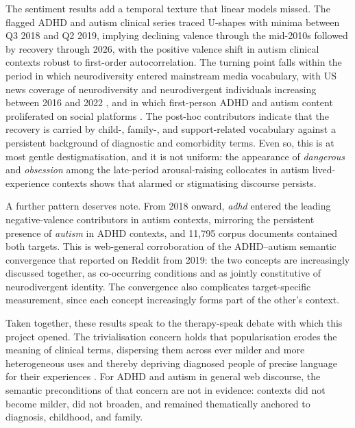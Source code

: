 The sentiment results add a temporal texture that linear models missed. The flagged ADHD and autism clinical series traced U-shapes with minima between Q3 2018 and Q2 2019, implying declining valence through the mid-2010s followed by recovery through 2026, with the positive valence shift in autism clinical contexts robust to first-order autocorrelation. The turning point falls within the period in which neurodiversity entered mainstream media vocabulary, with US news coverage of neurodiversity and neurodivergent individuals increasing between 2016 and 2022 \citep{huang-horowitzExploringMediaDiscourse2025}, and in which first-person ADHD and autism content proliferated on social platforms \citep{hartnettSocialMediaADHD2024,alperTikTokAlgorithmicallyMediated2025}. The post-hoc contributors indicate that the recovery is carried by child-, family-, and support-related vocabulary against a persistent background of diagnostic and comorbidity terms. Even so, this is at most gentle destigmatisation, and it is not uniform: the appearance of \emph{dangerous} and \emph{obsession} among the late-period arousal-raising collocates in autism lived-experience contexts shows that alarmed or stigmatising discourse persists.

A further pattern deserves note. From 2018 onward, \emph{adhd} entered the leading negative-valence contributors in autism contexts, mirroring the persistent presence of \emph{autism} in ADHD contexts, and 11,795 corpus documents contained both targets. This is web-general corroboration of the ADHD--autism semantic convergence that \citet{kangConvergingRepresentationsAttentionDeficit2025} reported on Reddit from 2019: the two concepts are increasingly discussed together, as co-occurring conditions and as jointly constitutive of neurodivergent identity. The convergence also complicates target-specific measurement, since each concept increasingly forms part of the other's context.

Taken together, these results speak to the therapy-speak debate with which this project opened. The trivialisation concern holds that popularisation erodes the meaning of clinical terms, dispersing them across ever milder and more heterogeneous uses and thereby depriving diagnosed people of precise language for their experiences \citep{isern-masUnmaskingTherapyspeak2025,spencerIsntEveryoneLittle2021}. For ADHD and autism in general web discourse, the semantic preconditions of that concern are not in evidence: contexts did not become milder, did not broaden, and remained thematically anchored to diagnosis, childhood, and family. 

